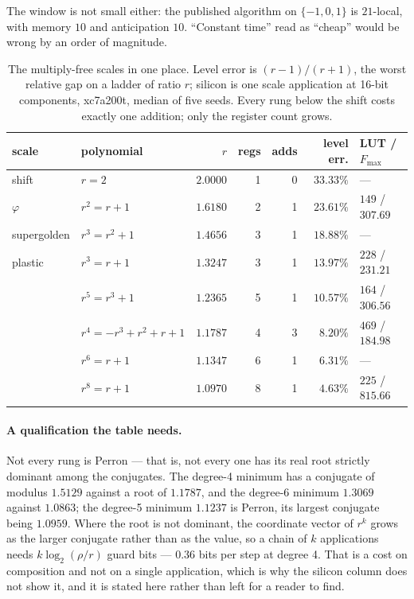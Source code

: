 \documentclass[11pt]{article}
\theoremstyle{definition}
\begin{document}
The window is not small either: the published algorithm on $\{-1,0,1\}$ is
$21$-local, with memory $10$ and anticipation $10$. ``Constant time'' read as
``cheap'' would be wrong by an order of magnitude.

\begin{table}[t]\centering
\caption{The multiply-free scales in one place. Level error is $(r-1)/(r+1)$,
the worst relative gap on a ladder of ratio $r$; silicon is one scale
application at 16-bit components, xc7a200t, median of five seeds. Every rung
below the shift costs exactly one addition; only the register count grows.}
\label{tab:allscales}
\begin{tabular}{llrrrrl}
\toprule
scale & polynomial & $r$ & regs & adds & level err. & LUT / $F_{\max}$ \\
\midrule
shift        & $r=2$              & $2.0000$ & 1 & 0 & $33.33\%$ & --- \\
$\varphi$    & $r^2=r+1$          & $1.6180$ & 2 & 1 & $23.61\%$ & $149$ / $307.69$ \\
supergolden  & $r^3=r^2+1$        & $1.4656$ & 3 & 1 & $18.88\%$ & --- \\
plastic      & $r^3=r+1$          & $1.3247$ & 3 & 1 & $13.97\%$ & $228$ / $231.21$ \\
             & $r^5=r^3+1$        & $1.2365$ & 5 & 1 & $10.57\%$ & $164$ / $306.56$ \\
             & $r^4{=}{-}r^3{+}r^2{+}r{+}1$ & $1.1787$ & 4 & 3 & $8.20\%$ & $469$ / $184.98$ \\
             & $r^6=r+1$          & $1.1347$ & 6 & 1 & $6.31\%$ & --- \\
             & $r^8=r+1$          & $1.0970$ & 8 & 1 & $4.63\%$ & $225$ / $815.66$ \\
\bottomrule
\end{tabular}
\end{table}

\paragraph{A qualification the table needs.} Not every rung is Perron --- that
is, not every one has its real root strictly dominant among the conjugates. The
degree-4 minimum has a conjugate of modulus $1.5129$ against a root of
$1.1787$, and the degree-6 minimum $1.3069$ against $1.0863$; the degree-5
minimum $1.1237$ is Perron, its largest conjugate being $1.0959$. Where the
root is not dominant, the coordinate vector of $r^{k}$ grows as the larger
conjugate rather than as the value, so a chain of $k$ applications needs
$k\log_2(\rho/r)$ guard bits --- $0.36$ bits per step at degree 4. That is a cost
on composition and not on a single application, which is why the silicon column
does not show it, and it is stated here rather than left for a reader to find.
\end{document}
